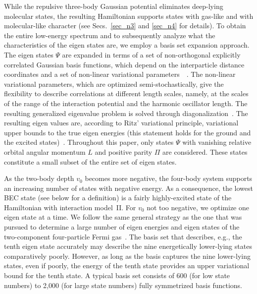 \documentclass[aps,pra,twocolumn,showpacs,superscriptaddress]{revtex4}
\begin{document}
While the repulsive 
three-body Gaussian potential eliminates deep-lying molecular states,
the resulting Hamiltonian supports states with gas-like and 
with molecular-like
character (see Secs.~\ref{sec_n3} and \ref{sec_n4} for
details).
To obtain the entire low-energy spectrum and to
subsequently analyze  what the characteristics
of the eigen states are, we employ a basis set expansion approach.
The eigen states $\Psi$ are expanded in terms of a set
of non-orthogonal explicitly correlated Gaussian basis functions,
which depend on the interparticle distance
coordinates and a set of non-linear variational   
parameters~~\cite{cgbook,mitroy2013}.
The non-linear variational parameters, which are optimized
semi-stochastically, give the flexibility
to describe correlations at different length scales,
namely, at the scales of the range
of the interaction potential and 
the harmonic oscillator length.
The
resulting generalized eigenvalue
problem is solved through diagonalization~\cite{cgbook,mitroy2013}.
The resulting eigen values are, according to
Ritz' variational principle, variational upper bounds to the true
eigen energies (this statement holds for the ground and the excited
states)~\cite{cgbook}.
Throughout this paper, only states $\Psi$ with
vanishing relative orbital angular momentum $L$ and positive parity 
$\Pi$ are considered.
These states constitute a small subset of the entire set of eigen states.

As the two-body depth $v_0$ becomes more negative, the 
four-body system supports an increasing number of states with negative 
energy. As a consequence, the lowest BEC state 
(see below for a definition) is a fairly
highly-excited state of the Hamiltonian with interaction model~II.
For $v_0$ not too negative, we optimize one eigen state
at a time. We follow the same general strategy
as the one that was pursued to determine
a
large number of eigen energies and eigen states 
of the two-component
four-particle Fermi gas~\cite{rakshit2012}. 
The basis set 
that describes, e.g., the tenth eigen state accurately
may describe the nine energetically lower-lying
states comparatively poorly. However, as long as the
basis captures the nine lower-lying states, even if poorly,
the energy of the tenth state provides an upper variational bound for
the tenth state. 
A typical basis set
consists of 600 (for low state numbers) to 2,000
(for large state numbers) fully symmetrized basis functions.
\end{document}
